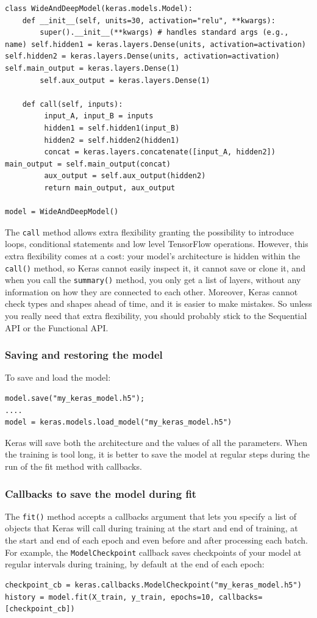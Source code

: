\begin{lstlisting}
class WideAndDeepModel(keras.models.Model):
    def __init__(self, units=30, activation="relu", **kwargs):
        super().__init__(**kwargs) # handles standard args (e.g., name) self.hidden1 = keras.layers.Dense(units, activation=activation) self.hidden2 = keras.layers.Dense(units, activation=activation) self.main_output = keras.layers.Dense(1)
        self.aux_output = keras.layers.Dense(1)

    def call(self, inputs):
         input_A, input_B = inputs
         hidden1 = self.hidden1(input_B)
         hidden2 = self.hidden2(hidden1)
         concat = keras.layers.concatenate([input_A, hidden2]) main_output = self.main_output(concat)
         aux_output = self.aux_output(hidden2)
         return main_output, aux_output

model = WideAndDeepModel()
\end{lstlisting}
The \lstinline+call+ method allows extra flexibility granting the possibility to introduce loops, conditional statements and low level TensorFlow operations. However, this extra flexibility comes at a cost: your model’s architecture is hidden within the \lstinline+call()+ method, so Keras cannot easily inspect it, it cannot save or clone it, and when you call the \lstinline+summary()+ method, you only get a list of layers, without any information on how they are connected to each other. Moreover, Keras cannot check types and shapes ahead of time, and it is easier to make mistakes. So unless you really need that extra flexibility, you should probably stick to the Sequential API or the Functional API.

\subsubsection{Saving and restoring the model}
To save and load the model:
\begin{lstlisting}
model.save("my_keras_model.h5");
....
model = keras.models.load_model("my_keras_model.h5")
\end{lstlisting}
Keras will save both the architecture and the values of all the parameters. When the training is tool long, it is better to save the model at regular steps during the run of the fit method with callbacks.

\subsubsection{Callbacks to save the model during fit}
The \lstinline+fit()+ method accepts a callbacks argument that lets you specify a list of objects that Keras will call during training at the start and end of training, at the start and end of each epoch and even before and after processing each batch. For example, the \lstinline+ModelCheckpoint+ callback saves checkpoints of your model at regular intervals during training, by default at the end of each epoch:
\begin{lstlisting}
checkpoint_cb = keras.callbacks.ModelCheckpoint("my_keras_model.h5")
history = model.fit(X_train, y_train, epochs=10, callbacks=[checkpoint_cb])
\end{lstlisting}


